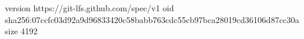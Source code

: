 version https://git-lfs.github.com/spec/v1
oid sha256:07ccfc03d92a9d96833420c58babb763cdc55cb97bca28019cd36106d87cc30a
size 4192
